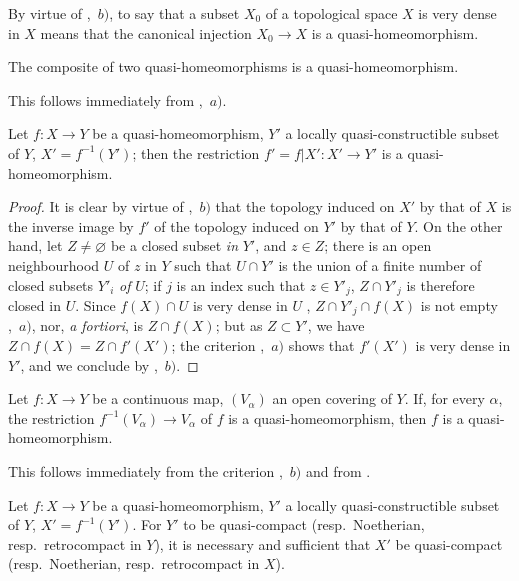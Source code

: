 By virtue of ,~$b)$, to say that a subset $X_0$ of a topological space $X$ is very dense in $X$ means that the canonical injection $X_0\to X$ is a quasi-homeomorphism.

\begin{corollary}[10.2.3]
\label{IV.10.2.3}
The composite of two quasi-homeomorphisms is a quasi-homeomorphism.
\end{corollary}

This follows immediately from ,~$a)$.

\begin{corollary}[10.2.4]
\label{IV.10.2.4}
Let $f:X\to Y$ be a quasi-homeomorphism, $Y'$ a locally quasi-constructible subset of $Y$, $X'=f^{-1}(Y')$; then the restriction $f'=f|X':X'\to Y'$ is a quasi-homeomorphism.
\end{corollary}

\begin{proof}
It is clear by virtue of ,~$b)$ that the topology induced on $X'$ by that of $X$ is the inverse image by $f'$ of the topology induced on $Y'$ by that of $Y$.
On the other hand,
let $Z\neq\varnothing$ be a closed subset \emph{in} $Y'$, and $z\in Z$; there is an open neighbourhood $U$ of $z$ in $Y$ such that $U\cap Y'$ is the union of a finite number of closed subsets $Y'_i$ \emph{of} $U$; if $j$ is an index such that $z\in Y'_j$, $Z\cap Y'_j$ is therefore closed in $U$.
Since $f(X)\cap U$ is very dense in $U$ , $Z\cap Y'_j\cap f(X)$ is not empty ,~$a)$, nor, \emph{a fortiori}, is $Z\cap f(X)$; but as $Z\subset Y'$, we have $Z\cap f(X)=Z\cap f'(X')$; the criterion ,~$a)$ shows that $f'(X')$ is very dense in $Y'$, and we conclude by ,~$b)$.
\end{proof}

\begin{corollary}[10.2.5]
\label{IV.10.2.5}
Let $f:X\to Y$ be a continuous map, $(V_\alpha)$ an open covering of $Y$.
If, for every $\alpha$, the restriction $f^{-1}(V_\alpha)\to V_\alpha$ of $f$ is a quasi-homeomorphism, then $f$ is a quasi-homeomorphism.
\end{corollary}

This follows immediately from the criterion ,~$b)$ and from .

\begin{corollary}[10.2.6]
\label{IV.10.2.6}
Let $f:X\to Y$ be a quasi-homeomorphism, $Y'$ a locally quasi-constructible subset of $Y$, $X'=f^{-1}(Y')$.
For $Y'$ to be quasi-compact (\textup{resp.}\ Noetherian, \textup{resp.}\ retrocompact in $Y$), it is necessary and sufficient that $X'$ be quasi-compact (\textup{resp.}\ Noetherian, \textup{resp.}\ retrocompact in $X$).
\end{corollary}

